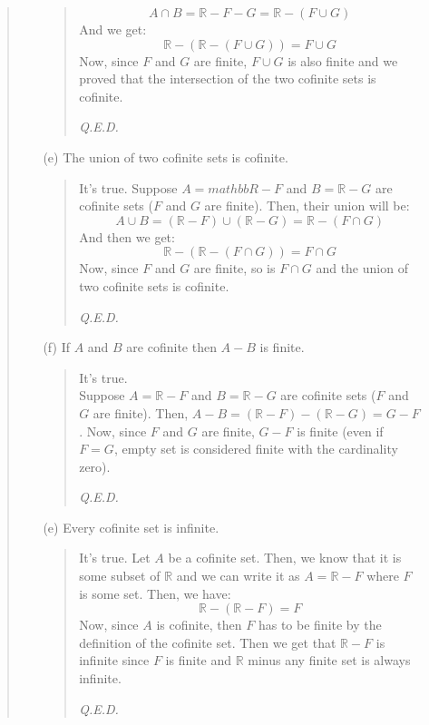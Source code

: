 \documentclass[12pt, a4paper]{article}                      %
\begin{document}
\begin{enumerate}
\begin{quote}
\begin{itemize}
\begin{quote}
$$A \cap B = \mathbb{R} - F - G = \mathbb{R} - (F \cup G)$$
And we get:
$$\mathbb{R}  - (\mathbb{R} - (F \cup G)) = F \cup G$$
Now, since $F$ and $G$ are finite, $F \cup G$ is also finite
and we proved that the intersection of the two cofinite sets is cofinite.
\begin{flushright}
\textit{Q.E.D.}
\end{flushright}
\end{quote}
\item[(e)]
The union of two cofinite sets is cofinite.
\begin{quote}
It's true.
Suppose $A = mathbb{R} - F$ and $B = \mathbb{R} - G$ are cofinite sets ($F$ and $G$ are finite).
Then, their union will be:
$$A \cup B = (\mathbb{R} - F) \cup (\mathbb{R} - G) = \mathbb{R} - (F \cap G)$$
And then we get:
$$\mathbb{R} - (\mathbb{R} - (F \cap G)) = F \cap G$$
Now, since $F$ and $G$ are finite, so is $F \cap G$ and the union of two cofinite
sets is cofinite.
\begin{flushright}
\textit{Q.E.D.}
\end{flushright}
\end{quote}
\item[(f)]
If $A$ and $B$ are cofinite then $A - B$ is finite.
\begin{quote}
It's true.\\
Suppose $A = \mathbb{R} - F$ and $B = \mathbb{R} - G$ are cofinite sets ($F$ and $G$ are finite).
Then, $A - B = (\mathbb{R} - F) - (\mathbb{R} - G) = G - F$.
Now, since $F$ and $G$ are finite, $G - F$ is finite (even if $F = G$, empty set is considered finite
with the cardinality zero).
\begin{flushright}
\textit{Q.E.D.}
\end{flushright}
\end{quote}
\item[(e)]
Every cofinite set is infinite.
\begin{quote}
It's true.
Let $A$ be a cofinite set. Then, we know that it is some subset of $\mathbb{R}$
and we can write it as $A = \mathbb{R} - F$ where $F$ is some set.
Then, we have:
$$\mathbb{R} - (\mathbb{R} - F) = F$$
Now, since $A$ is cofinite, then $F$ has to be finite by the definition of the cofinite set.
Then we get that $\mathbb{R} - F$ is infinite since $F$ is finite and $\mathbb{R}$ minus
any finite set is always infinite.
\begin{flushright}
\textit{Q.E.D.}
\end{flushright}
\end{quote}
\end{itemize}

\end{quote}
\end{enumerate}
\end{document}
